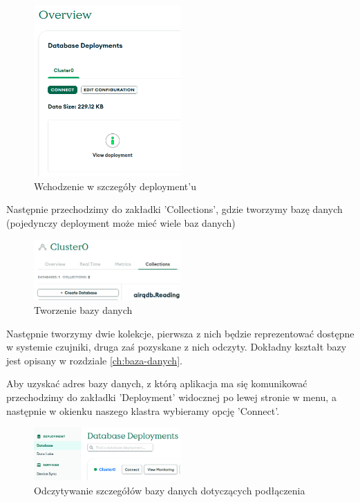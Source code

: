 \begin{figure}[H]
    \centering
    \includegraphics[width=0.5\textwidth]{zdj/atlas_2.png}
    \caption{Wchodzenie w szczegóły deployment'u}
\end{figure}

Następnie przechodzimy do zakładki 'Collections', gdzie tworzymy bazę danych (pojedynczy deployment może mieć wiele baz danych)

\begin{figure}[H]
    \centering
    \includegraphics[width=0.5\textwidth]{zdj/atlas_3.png}
    \caption{Tworzenie bazy danych}
\end{figure}

Następnie tworzymy dwie kolekcje, pierwsza z nich będzie reprezentować dostępne w systemie czujniki, druga zaś pozyskane z nich odczyty. Dokładny
kształt bazy jest opisany w rozdziale \ref{ch:baza-danych}.

Aby uzyskać adres bazy danych, z którą aplikacja ma się komunikować przechodzimy do zakładki 'Deployment' widocznej po lewej stronie w menu, a następnie 
w okienku naszego klastra wybieramy opcję 'Connect'. 

\begin{figure}[H]
    \centering
    \includegraphics[width=0.5\textwidth]{zdj/atlas_4.png}
    \caption{Odczytywanie szczegółów bazy danych dotyczących podłączenia}
\end{figure}

